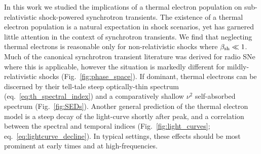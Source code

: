 \documentclass[twocolumn]{aastex63}
\begin{document}
In this work we studied the implications of a thermal electron population on sub-relativistic shock-powered synchrotron transients. 
The existence of a thermal electron population is a natural expectation in shock scenarios, yet has garnered little attention in the context of synchrotron transients. 
We find that neglecting thermal electrons is reasonable only for non-relativistic shocks where $\beta_{\rm sh} \ll 1$. Much of the canonical synchrotron transient literature was derived for radio SNe where this is applicable, however the situation is markedly different for mildly-relativistic shocks (Fig.~\ref{fig:phase_space}). 
If dominant, thermal electrons can be discerned by their tell-tale steep optically-thin spectrum (eq.~\ref{eq:th_spectral_index}) and a comparatively shallow $\nu^2$ self-absorbed spectrum (Fig.~\ref{fig:SEDs}). Another general prediction of the thermal electron model is a steep decay of the light-curve shortly after peak, and a correlation between the spectral and temporal indices (Fig.~\ref{fig:light_curves}; eq.~\ref{eq:lightcurve_decline}). In typical settings, these effects should be most prominent at early times and at high-frequencies.
\end{document}
